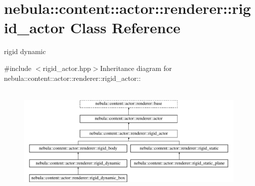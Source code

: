 \hypertarget{classnebula_1_1content_1_1actor_1_1renderer_1_1rigid__actor}{
\section{nebula::content::actor::renderer::rigid\_\-actor Class Reference}
\label{classnebula_1_1content_1_1actor_1_1renderer_1_1rigid__actor}
}


rigid dynamic  


{\ttfamily \#include $<$rigid\_\-actor.hpp$>$}Inheritance diagram for nebula::content::actor::renderer::rigid\_\-actor::\begin{figure}[H]
\begin{center}
\leavevmode
\includegraphics[height=5.45455cm]{classnebula_1_1content_1_1actor_1_1renderer_1_1rigid__actor}
\end{center}
\end{figure}
